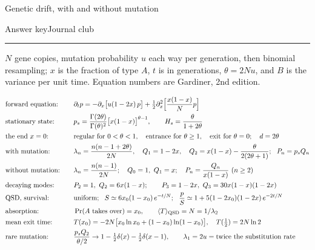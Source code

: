 \documentclass[11pt]{article}
\newcommand{\avg}[1]{\langle #1\rangle}
\newcommand{\sheethead}[1]{%
  {\sffamily\Large\color{PineGreen}Genetic drift, with and without mutation}\par\vspace{2pt}
  {\sffamily\small Answer key\hfill #1}\par\vspace{-7pt}
  \rule{\textwidth}{0.5pt}\par\vspace{2pt}}
\begin{document}
\sheethead{Journal club}

$N$ gene copies, mutation probability $u$ each way per generation, then binomial resampling; $x$ is the fraction of
type $A$, $t$ is in generations, $\theta=2Nu$, and $B$ is the variance per unit time. Equation numbers are Gardiner,
2nd edition.

\begin{keyresults}
\small
\vspace{-6pt}
\begin{alignat*}{2}
  &\text{forward equation:} &\quad& \partial_tp=-\partial_x\bigl[u(1-2x)\,p\bigr]+\tfrac12\partial_x^2\Bigl[\frac{x(1-x)}Np\Bigr] \\
  &\text{stationary state:} &\quad& p_s=\frac{\Gamma(2\theta)}{\Gamma(\theta)^2}\bigl[x(1-x)\bigr]^{\theta-1},\qquad
     H_s=\frac\theta{1+2\theta} \\
  &\text{the end }x=0\text{:} &\quad& \text{regular for }0<\theta<1,\quad\text{entrance for }\theta\ge1,\quad
     \text{exit for }\theta=0;\quad d=2\theta \\
  &\text{with mutation:} &\quad& \lambda_n=\frac{n(n-1+2\theta)}{2N},\quad Q_1=1-2x,\quad
     Q_2=x(1-x)-\frac\theta{2(2\theta+1)};\ \ P_n=p_sQ_n \\
  &\text{without mutation:} &\quad& \lambda_n=\frac{n(n-1)}{2N};\quad Q_0=1,\ Q_1=x;\quad P_n=\frac{Q_n}{x(1-x)}\ (n\ge2) \\
  &\text{decaying modes:} &\quad& P_2=1,\ Q_2=6x(1-x);\qquad P_3=1-2x,\ Q_3=30x(1-x)(1-2x) \\
  &\text{QSD, survival:} &\quad& \text{uniform};\ \ S\simeq6x_0(1-x_0)\,e^{-t/N};\ \
     \frac pS\simeq1+5(1-2x_0)(1-2x)\,e^{-2t/N} \\
  &\text{absorption:} &\quad& \Pr(A\text{ takes over})=x_0,\qquad \avg T_{\rm QSD}=N=1/\lambda_2 \\
  &\text{mean exit time:} &\quad& T(x_0)=-2N\bigl[x_0\ln x_0+(1-x_0)\ln(1-x_0)\bigr],\quad T(\tfrac12)=2N\ln2 \\
  &\text{rare mutation:} &\quad& \frac{p_sQ_2}{\theta/2}\to1-\tfrac12\delta(x)-\tfrac12\delta(x-1),\qquad
     \lambda_1=2u=\text{twice the substitution rate}
\end{alignat*}
\end{keyresults}
\end{document}
